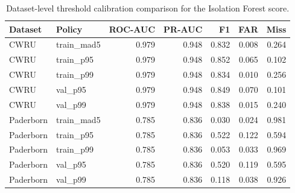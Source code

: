 \begin{table}[t]
\centering
\caption{Dataset-level threshold calibration comparison for the Isolation Forest score.}
\label{tab:calibration_policies}
\small
\begin{tabular}{llrrrrr}
\toprule
Dataset & Policy & ROC-AUC & PR-AUC & F1 & FAR & Miss \\
\midrule
CWRU & train\_mad5 & 0.979 & 0.948 & 0.832 & 0.008 & 0.264 \\
CWRU & train\_p95 & 0.979 & 0.948 & 0.852 & 0.065 & 0.102 \\
CWRU & train\_p99 & 0.979 & 0.948 & 0.834 & 0.010 & 0.256 \\
CWRU & val\_p95 & 0.979 & 0.948 & 0.849 & 0.070 & 0.101 \\
CWRU & val\_p99 & 0.979 & 0.948 & 0.838 & 0.015 & 0.240 \\
Paderborn & train\_mad5 & 0.785 & 0.836 & 0.030 & 0.024 & 0.981 \\
Paderborn & train\_p95 & 0.785 & 0.836 & 0.522 & 0.122 & 0.594 \\
Paderborn & train\_p99 & 0.785 & 0.836 & 0.053 & 0.033 & 0.969 \\
Paderborn & val\_p95 & 0.785 & 0.836 & 0.520 & 0.119 & 0.595 \\
Paderborn & val\_p99 & 0.785 & 0.836 & 0.118 & 0.038 & 0.926 \\
\bottomrule
\end{tabular}
\end{table}